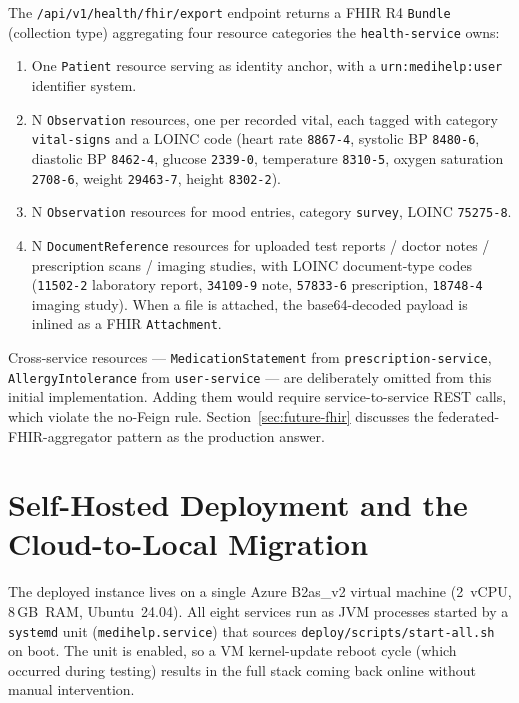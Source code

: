 \documentclass[12pt]{caltech_thesis}
\begin{document}
The \texttt{/api/v1/health/fhir/export} endpoint returns a FHIR R4
\texttt{Bundle} (collection type) aggregating four resource categories
the \texttt{health-service} owns:
\begin{enumerate}
    \item One \texttt{Patient} resource serving as identity anchor, with
    a \texttt{urn:medihelp:user} identifier system.
    \item N \texttt{Observation} resources, one per recorded vital, each
    tagged with category \texttt{vital-signs} and a LOINC code
    (heart rate \texttt{8867-4}, systolic BP \texttt{8480-6},
    diastolic BP \texttt{8462-4}, glucose \texttt{2339-0}, temperature
    \texttt{8310-5}, oxygen saturation \texttt{2708-6}, weight
    \texttt{29463-7}, height \texttt{8302-2}).
    \item N \texttt{Observation} resources for mood entries, category
    \texttt{survey}, LOINC \texttt{75275-8}.
    \item N \texttt{DocumentReference} resources for uploaded test
    reports / doctor notes / prescription scans / imaging studies, with
    LOINC document-type codes (\texttt{11502-2} laboratory report,
    \texttt{34109-9} note, \texttt{57833-6} prescription,
    \texttt{18748-4} imaging study). When a file is attached, the
    base64-decoded payload is inlined as a FHIR \texttt{Attachment}.
\end{enumerate}

Cross-service resources --- \texttt{MedicationStatement} from
\texttt{prescription-service}, \texttt{AllergyIntolerance} from
\texttt{user-service} --- are deliberately omitted from this initial
implementation. Adding them would require service-to-service REST calls,
which violate the no-Feign rule. Section~\ref{sec:future-fhir} discusses
the federated-FHIR-aggregator pattern as the production answer.

\section{Self-Hosted Deployment and the Cloud-to-Local Migration}

The deployed instance lives on a single Azure B2as\_v2 virtual machine
(2~vCPU, 8\,GB~RAM, Ubuntu~24.04). All eight services run as
JVM processes started by a \texttt{systemd} unit
(\texttt{medihelp.service}) that sources \texttt{deploy/scripts/start-all.sh}
on boot. The unit is enabled, so a VM kernel-update reboot cycle (which
occurred during testing) results in the full stack coming back online
without manual intervention.
\end{document}
